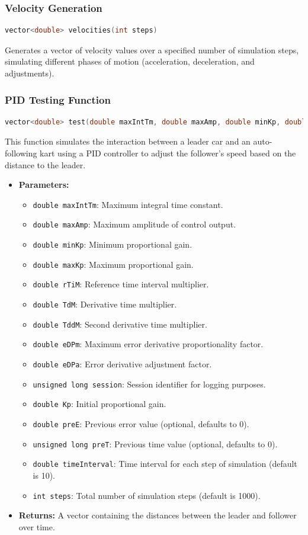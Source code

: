 \documentclass[a4paper,12pt]{article}
\begin{document}
\subsubsection{Velocity Generation}
\begin{lstlisting}[language=cpp]
vector<double> velocities(int steps)
\end{lstlisting}
Generates a vector of velocity values over a specified number of simulation steps, simulating different phases of motion (acceleration, deceleration, and adjustments).
\subsubsection{PID Testing Function}
\begin{lstlisting}[language=cpp]
vector<double> test(double maxIntTm, double maxAmp, double minKp, double maxKp, double rTiM, double TdM, double TddM, double eDPm, double eDPa, unsigned long session, double Kp, double preE = 0, unsigned long preT = 0, double timeInterval = 10, int steps = 1000)
\end{lstlisting}
This function simulates the interaction between a leader car and an auto-following kart using a PID controller to adjust the follower's speed based on the distance to the leader.
\begin{itemize}
\item \textbf{Parameters:}
\begin{itemize}
\item \texttt{double maxIntTm}: Maximum integral time constant.
\item \texttt{double maxAmp}: Maximum amplitude of control output.
\item \texttt{double minKp}: Minimum proportional gain.
\item \texttt{double maxKp}: Maximum proportional gain.
\item \texttt{double rTiM}: Reference time interval multiplier.
\item \texttt{double TdM}: Derivative time multiplier.
\item \texttt{double TddM}: Second derivative time multiplier.
\item \texttt{double eDPm}: Maximum error derivative proportionality factor.
\item \texttt{double eDPa}: Error derivative adjustment factor.
\item \texttt{unsigned long session}: Session identifier for logging purposes.
\item \texttt{double Kp}: Initial proportional gain.
\item \texttt{double preE}: Previous error value (optional, defaults to 0).
\item \texttt{unsigned long preT}: Previous time value (optional, defaults to 0).
\item \texttt{double timeInterval}: Time interval for each step of simulation (default is 10).
\item \texttt{int steps}: Total number of simulation steps (default is 1000).
\end{itemize}
\item \textbf{Returns:} A vector containing the distances between the leader and follower over time.
\end{itemize}
\end{document}
